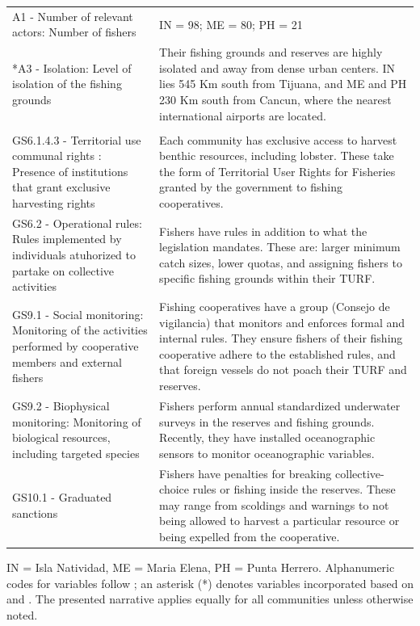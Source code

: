 \documentclass[10pt,letterpaper]{article}
\providecommand{\DIFaddendFL}{} %
\DeclareRobustCommand{\DIFaddendFL}{\DIFOaddendFL \let\includegraphics\DIFOincludegraphics} %
\begin{document}
\begin{table}[!ht]
{\begin{tabular}{>{\raggedright\arraybackslash}p{6.5cm}|>{\raggedright\arraybackslash}p{12.2cm}}
\hline
\multicolumn{2}{l}{\textbf{Actors (A)}}\\
\hline
\hspace{1em}A1 - Number of relevant actors: Number of fishers & IN = 98; ME = 80; PH = 21\\
\hline
\hspace{1em}*A3 - Isolation: Level of isolation of the fishing grounds & Their fishing grounds and reserves are highly isolated and away from dense urban centers. IN lies 545 Km south from Tijuana, and ME and PH 230 Km south from Cancun, where the nearest international airports are located.\\
\hline
\multicolumn{2}{l}{\textbf{Governance system (G)}}\\
\hline
\hspace{1em}GS6.1.4.3 - Territorial use communal rights : Presence of institutions that grant exclusive harvesting rights & Each community has exclusive access to harvest benthic resources, including lobster. These take the form of Territorial User Rights for Fisheries granted by the government to fishing cooperatives.\\
\hline
\hspace{1em}GS6.2 - Operational rules: Rules implemented by individuals atuhorized to partake on collective activities & Fishers have rules in addition to what the legislation mandates. These are: larger minimum catch sizes, lower quotas, and assigning fishers to specific fishing grounds within their TURF.\\
\hline
\hspace{1em}GS9.1 - Social monitoring: Monitoring of the activities performed by cooperative members and external fishers & Fishing cooperatives have a group (Consejo de vigilancia) that monitors and enforces formal and internal rules. They ensure fishers of their fishing cooperative adhere to the established rules, and that foreign vessels do not poach their TURF and reserves.\\
\hline
\hspace{1em}GS9.2 - Biophysical monitoring: Monitoring of biological resources, including targeted species & Fishers perform annual standardized underwater surveys in the reserves and fishing grounds. Recently, they have installed oceanographic sensors to monitor oceanographic variables.\\
\hline
GS10.1 - Graduated sanctions & Fishers have penalties for breaking collective-choice rules or fishing inside the reserves. These may range from scoldings and warnings to not being allowed to harvest a particular resource or being expelled from the cooperative.\\
\hline
\end{tabular}}
\DIFaddendFL \label{table:ses}
IN = Isla Natividad, ME = Maria Elena, PH = Punta Herrero. Alphanumeric codes for variables follow \cite{basurto_2013-oq}; an asterisk (*) denotes variables incorporated based on \cite{difranco_2016-Xw} and \cite{edgar_2014-UO}. The presented narrative applies equally for all communities unless otherwise noted.
\end{table}
\end{document}
